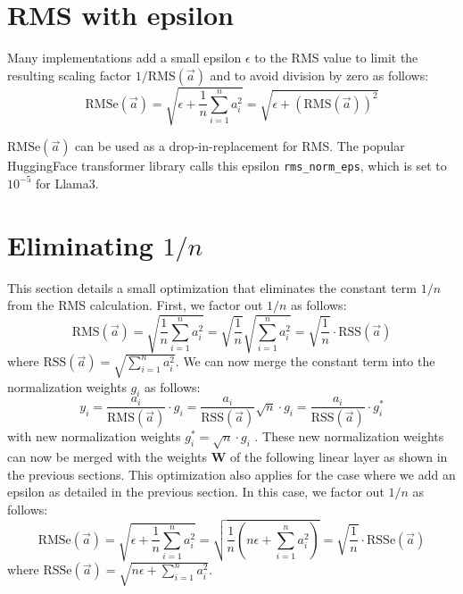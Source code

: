 \documentclass{article}
\newcommand{\mat}[1]{\mathbf{#1}}     %
\def\rms{\text{RMS}(\vec{a})}         %
\def\f1n{\frac{1}{n}}                 %
\def\sas{\sum_{i=1}^n a_i^2}          %
\def\a{\vec{a}}                       %
\begin{document}
\appendix

\section{RMS with epsilon}
Many implementations add a small epsilon $\epsilon$ to the RMS value to limit the resulting scaling factor $1/\rms$ and to avoid division by zero as follows:
\begin{equation*}
 \text{RMSe}(\a) = \sqrt{\epsilon + \f1n \sas} = \sqrt{\epsilon + \left( \rms \right)^2}
\end{equation*}

$\text{RMSe}(\a)$ can be used as a drop-in-replacement for RMS. The popular HuggingFace transformer library calls this epsilon \verb+rms_norm_eps+, which is set to $10^{-5}$ for Llama3.

\section{Eliminating $1/n$}
This section details a small optimization that eliminates the constant term $1/n$ from the RMS calculation. First, we factor out $1/n$ as follows:
\begin{equation*}
  \rms = \sqrt{\f1n \sas} = \sqrt{\f1n} \sqrt{\sas} = \sqrt{\f1n} \cdot \text{RSS}(\a)
\end{equation*}
where $\text{RSS}(\a) = \sqrt{\sas}$. We can now merge the constant term into the normalization weights $g_i$ as follows:
\begin{equation*}
  y_i = \frac{a_i}{\rms} \cdot g_i =
  \frac{a_i}{\text{RSS}(\a)} \sqrt{n} \cdot g_i =
  \frac{a_i}{\text{RSS}(\a)}          \cdot g_i^\ast
\end{equation*}
with new normalization weights $g_i^\ast = \sqrt{n} \cdot g_i$ . These new normalization weights can now be merged with the weights $\mat{W}$ of the following linear layer as shown in the previous sections. This optimization also applies for the case where we add an epsilon as detailed in the previous section. In this case, we factor out $1/n$ as follows:
\begin{equation*}
  \text{RMSe}(\a) = \sqrt{\epsilon + \f1n \sas}
  = \sqrt{\f1n \left( n \epsilon + \sas \right)}
  = \sqrt{\f1n} \cdot \text{RSSe}(\a)
\end{equation*}
where $\text{RSSe}(\a) = \sqrt{n \epsilon + \sas}$.



\end{document}
